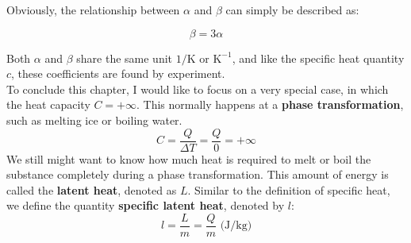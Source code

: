 \documentclass[phyai.tex]{subfiles}
\begin{document}
Obviously, the relationship between $\alpha$ and $\beta$ can simply be described as:
\begin{corollary}
	\label{The Relationship between two coefficients}
	$$\beta=3\alpha$$
\end{corollary}
Both $\alpha$ and $\beta$ share the same unit $1/ \text{K}$ or $\text{K}^{-1}$, and like the specific heat quantity $c$, these coefficients are found by experiment.
\\ To conclude this chapter, I would like to focus on a very special case, in which the heat capacity $C=+\infty$. This normally happens at a \textbf{phase transformation}, such as melting ice or boiling water.
$$ C=\frac{ Q }{\Delta T}=\frac{Q }{0}=+\infty$$
We still might want to know how much heat is required to melt or boil the substance completely during a phase transformation. This amount of energy is called the \textbf{latent heat}, denoted as $L$. Similar to the definition of specific heat, we define the quantity \textbf{specific latent heat}, denoted by $l$: $$ l=\frac{L }{m}=\frac{Q }{m} \text{ (J/kg)}$$
\end{document}
